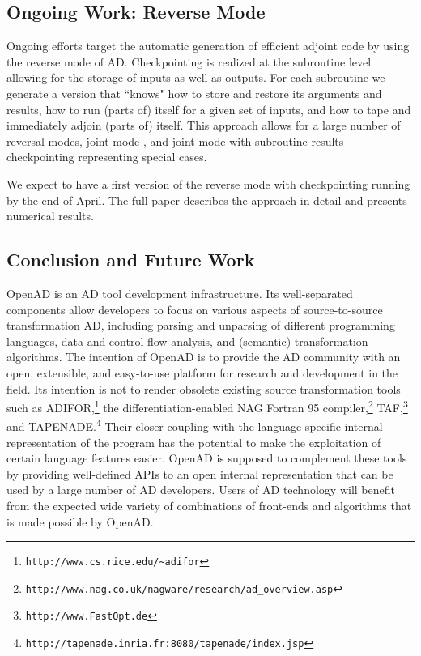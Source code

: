 \documentclass{article}
\begin{document}
\subsection*{Ongoing Work: Reverse Mode}

Ongoing efforts target the automatic generation of efficient adjoint
code by using the reverse mode of AD. Checkpointing is realized at the 
subroutine level allowing for the storage of inputs as well as outputs. 
For each subroutine we generate a version that ``knows" how to store and 
restore its arguments and results, how to run (parts of) itself for a given
set of inputs, and how to tape and immediately adjoin (parts of) itself.
This approach allows for a large number of reversal modes, 
joint mode \cite{Gri00}, and joint mode with subroutine results checkpointing 
representing special cases. 

We expect to have a first version of the reverse mode with checkpointing
running by the end of April. The full paper describes the approach in detail 
and presents numerical results.

\subsection*{Conclusion and Future Work}

OpenAD is an AD tool development infrastructure. Its well-separated components
allow developers to focus on various aspects of source-to-source 
transformation AD, including parsing and unparsing of different programming
languages, data and control flow analysis, and (semantic) transformation 
algorithms. The intention of OpenAD is to provide the AD community with 
an open, extensible, and easy-to-use platform for research and development
in the field. Its intention is not to render obsolete existing source transformation
tools such as ADIFOR,\footnote{{\tt http://www.cs.rice.edu/\~\!adifor}} 
the differentiation-enabled NAG Fortran 95 
compiler,\footnote{{\tt http://www.nag.co.uk/nagware/research/ad\_overview.asp}} TAF,\footnote{{\tt http://www.FastOpt.de}} and TAPENADE.\footnote{{\tt http://tapenade.inria.fr:8080/tapenade/index.jsp}} 
Their closer coupling with the language-specific internal representation of 
the program has the potential to make the
exploitation of certain language features easier. OpenAD is supposed to 
complement these tools by providing well-defined APIs to an open internal 
representation that can be used by a large number of AD developers.
Users of AD technology will benefit from the expected wide
variety of combinations of front-ends and algorithms that is made possible
by OpenAD.
\end{document}

